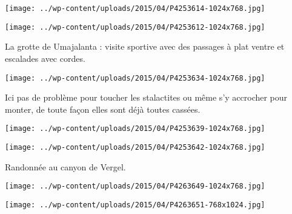  

 

\begin{center} \texttt{[image: ../wp-content/uploads/2015/04/P4253614-1024x768.jpg]} \end{center}

 

 

\begin{center} \texttt{[image: ../wp-content/uploads/2015/04/P4253612-1024x768.jpg]} \end{center}

 

 La grotte de Umajalanta : visite sportive avec des passages à plat ventre et escalades avec cordes. 

 

\begin{center} \texttt{[image: ../wp-content/uploads/2015/04/P4253634-1024x768.jpg]} \end{center}

 

 Ici pas de problème pour toucher les stalactites ou même s'y accrocher pour monter, de toute façon elles sont déjà toutes cassées. 

 

\begin{center} \texttt{[image: ../wp-content/uploads/2015/04/P4253639-1024x768.jpg]} \end{center}

 

 

\begin{center} \texttt{[image: ../wp-content/uploads/2015/04/P4253642-1024x768.jpg]} \end{center}

 

 Randonnée au canyon de Vergel. 

 

\begin{center} \texttt{[image: ../wp-content/uploads/2015/04/P4263649-1024x768.jpg]} \end{center}

 

 

\begin{center} \texttt{[image: ../wp-content/uploads/2015/04/P4263651-768x1024.jpg]} \end{center}

